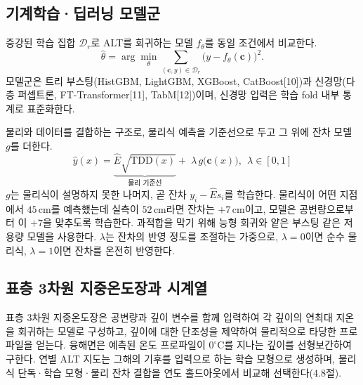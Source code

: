 \documentclass[10pt,twocolumn]{article}
\begin{document}
\subsection{기계학습·딥러닝 모델군}
증강된 학습 집합 $\mathcal D_r$로 ALT를 회귀하는 모델 $f_\theta$를 동일 조건에서 비교한다.
\begin{equation}
\hat\theta=\arg\min_{\theta}\sum_{(\mathbf c,y)\in\mathcal D_r}\big(y-f_\theta(\mathbf c)\big)^2 .
\label{eq:fit}
\end{equation}
모델군은 트리 부스팅(HistGBM, LightGBM, XGBoost, CatBoost[10])과 신경망(다층 퍼셉트론, FT-Transformer[11], TabM[12])이며, 신경망 입력은 학습 fold 내부 통계로 표준화한다.

물리와 데이터를 결합하는 구조로, 물리식 예측을 기준선으로 두고 그 위에 잔차 모델 $g$를 더한다.
\begin{equation}
\hat y(x)=\underbrace{\hat E\sqrt{\mathrm{TDD}(x)}}_{\text{물리 기준선}}
+\;\lambda\, g\big(\mathbf c(x)\big),\ \ \lambda\in[0,1]
\label{eq:residual}
\end{equation}
$g$는 물리식이 설명하지 못한 나머지, 곧 잔차 $y_i-\hat E s_i$를 학습한다. 물리식이 어떤 지점에서 $45\,\mathrm{cm}$를 예측했는데 실측이 $52\,\mathrm{cm}$라면 잔차는 $+7\,\mathrm{cm}$이고, 모델은 공변량으로부터 이 $+7$을 맞추도록 학습한다. 과적합을 막기 위해 능형 회귀와 얕은 부스팅 같은 저용량 모델을 사용한다. $\lambda$는 잔차의 반영 정도를 조절하는 가중으로, $\lambda=0$이면 순수 물리식, $\lambda=1$이면 잔차를 온전히 반영한다.

\subsection{표층 3차원 지중온도장과 시계열}
표층 3차원 지중온도장은 공변량과 깊이 변수를 함께 입력하여 각 깊이의 연최대 지온을 회귀하는 모델로 구성하고, 깊이에 대한 단조성을 제약하여 물리적으로 타당한 프로파일을 얻는다. 융해면은 예측된 온도 프로파일이 $0^\circ\mathrm{C}$를 지나는 깊이를 선형보간하여 구한다. 연별 ALT 지도는 그해의 기후를 입력으로 하는 학습 모형으로 생성하며, 물리식 단독·학습 모형·물리 잔차 결합을 연도 홀드아웃에서 비교해 선택한다(4.8절).
\end{document}
